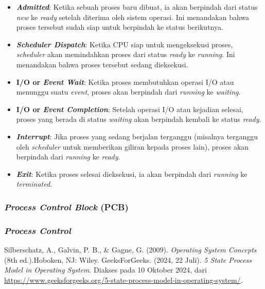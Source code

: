 \documentclass[12pt]{article}
\begin{document}
        \begin{itemize}
            \item \textbf{\textit{Admitted}}:
                Ketika sebuah proses baru dibuat, ia akan berpindah dari status \textit{new} ke
                \textit{ready} setelah diterima oleh sistem operasi. Ini menandakan bahwa proses
                tersebut sudah siap untuk berpindah ke status berikutnya.
            \item \textbf{\textit{Scheduler Dispatch}}:
                Ketika CPU siap untuk mengeksekusi proses, \textit{scheduler} akan memindahkan
                proses dari status \textit{ready} ke \textit{running}.  Ini menandakan bahwa
                proses tersebut sedang dieksekusi.
            \item \textbf{I/O or \textit{Event Wait}}:
                Ketika proses membutuhkan operasi I/O atau menunggu suatu \textit{event},
                proses akan berpindah dari \textit{running} ke \textit{waiting}.
            \item \textbf{I/O or \textit{Event Completion}}:
                Setelah operasi I/O atau kejadian selesai, proses yang berada di status
                \textit{waiting} akan berpindah kembali ke status \textit{ready}.
            \item \textbf{\textit{Interrupt}}:
                Jika proses yang sedang berjalan terganggu (misalnya terganggu oleh
                \textit{scheduler} untuk memberikan giliran kepada proses lain), 
                proses akan berpindah dari \textit{running} ke \textit{ready}.
            \item \textbf{\textit{Exit}}:
                Ketika proses selesai dieksekusi, ia akan berpindah dari \textit{running}
                ke \textit{terminated}.
        \end{itemize}

        \subsubsection {\textit{Process Control Block} (PCB)}

        \subsubsection {\textit{Process Control}}

    \begin{thebibliography}{9}
    Silberschatz, A., Galvin, P. B., \& Gagne, G. (2009). \textit{Operating System Concepts} (8th ed.).Hoboken, NJ: Wiley.
    GeeksForGeeks. (2024, 22 Juli). \textit{5 State Process Model in Operating System}. Diakses pada 10 Oktober 2024, dari \url{https://www.geeksforgeeks.org/5-state-process-model-in-operating-system/}.    
    \end{thebibliography}
\end{document}
